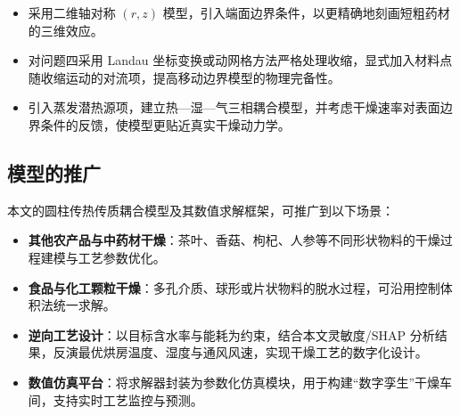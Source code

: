 \begin{itemize}
	\item 采用二维轴对称 $(r,z)$ 模型，引入端面边界条件，以更精确地刻画短粗药材的三维效应。
	\item 对问题四采用 Landau 坐标变换或动网格方法严格处理收缩，显式加入材料点随收缩运动的对流项，提高移动边界模型的物理完备性。
	\item 引入蒸发潜热源项，建立热—湿—气三相耦合模型，并考虑干燥速率对表面边界条件的反馈，使模型更贴近真实干燥动力学。
\end{itemize}

\subsection{模型的推广}

本文的圆柱传热传质耦合模型及其数值求解框架，可推广到以下场景：

\begin{itemize}
	\item \textbf{其他农产品与中药材干燥}：茶叶、香菇、枸杞、人参等不同形状物料的干燥过程建模与工艺参数优化。
	\item \textbf{食品与化工颗粒干燥}：多孔介质、球形或片状物料的脱水过程，可沿用控制体积法统一求解。
	\item \textbf{逆向工艺设计}：以目标含水率与能耗为约束，结合本文灵敏度/SHAP 分析结果，反演最优烘房温度、湿度与通风风速，实现干燥工艺的数字化设计。
	\item \textbf{数值仿真平台}：将求解器封装为参数化仿真模块，用于构建“数字孪生”干燥车间，支持实时工艺监控与预测。
\end{itemize}
